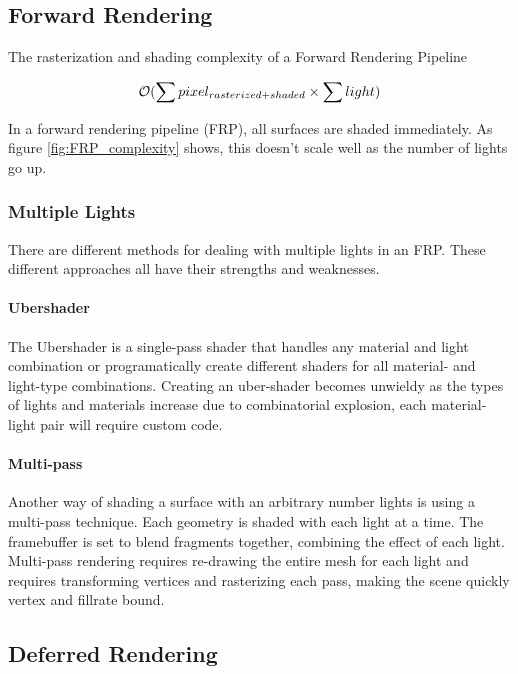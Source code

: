 \subsection{Forward Rendering}

The rasterization and shading complexity of a Forward Rendering Pipeline

\begin{equation}\label{fig:FRP_complexity}
  \mathcal{O}(\sum {pixel_{rasterized + shaded}} \times \sum light)
\end{equation}

In a forward rendering pipeline (FRP), all surfaces are shaded immediately. As figure \eqref{fig:FRP_complexity} shows, this doesn't scale well as the number of lights go up.

\subsubsection{Multiple Lights}

There are different methods for dealing with multiple lights in an FRP. These different approaches all have their strengths and weaknesses.

\paragraph{Ubershader}

The Ubershader is a single-pass shader that handles any material and light combination or programatically create different shaders for all material- and light-type combinations. Creating an uber-shader becomes unwieldy as the types of lights and materials increase due to combinatorial explosion, each material-light pair will require custom code.

\paragraph{Multi-pass}

Another way of shading a surface with an arbitrary number lights is using a multi-pass technique. Each geometry is shaded with each light at a time. The framebuffer is set to blend fragments together, combining the effect of each light. Multi-pass rendering requires re-drawing the entire mesh for each light and requires transforming vertices and rasterizing each pass, making the scene quickly vertex and fillrate bound.

\subsection{Deferred Rendering}

